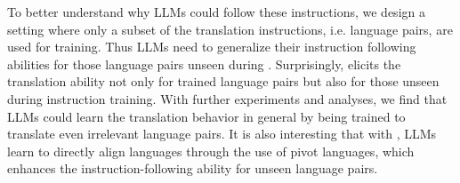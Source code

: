 To better understand why LLMs could follow these instructions, we design a \method setting where only a subset of the translation instructions, i.e. language pairs, are used for training. Thus LLMs need to generalize their instruction following abilities for those language pairs unseen during \methodend. Surprisingly, \method elicits the translation ability not only for trained language pairs but also for those unseen during instruction training. With further experiments and analyses, we find that LLMs could learn the translation behavior in general by being trained to translate even irrelevant language pairs. It is also interesting that with \methodend, LLMs learn to directly align languages through the use of pivot languages, which enhances the instruction-following ability for unseen language pairs.








